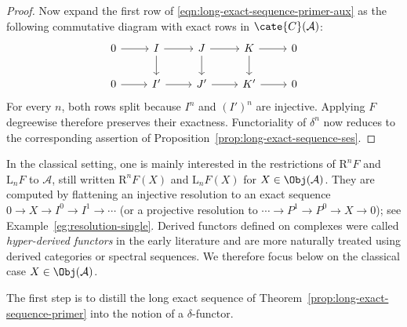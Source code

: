 \begin{proof}
	Now expand the first row of
	\eqref{eqn:long-exact-sequence-primer-aux} as the following commutative
	diagram with exact rows in $\cate{C}(\mathcal{A})$:
	\[\begin{tikzcd}
		0 \arrow[r] & I \arrow[d] \arrow[r] & J \arrow[d] \arrow[r] & K \arrow[d] \arrow[r] & 0 \\
		0 \arrow[r] & I' \arrow[r] & J' \arrow[r] & K' \arrow[r] & 0
	\end{tikzcd}\]
	For every $n$, both rows split because $I^n$ and $(I')^n$ are injective.
	Applying $F$ degreewise therefore preserves their exactness. Functoriality
	of $\delta^n$ now reduces to the corresponding assertion of
	Proposition~\ref{prop:long-exact-sequence-ses}.
\end{proof}

In the classical setting, one is mainly interested in the restrictions of
$\mathrm{R}^nF$ and $\mathrm{L}_nF$ to $\mathcal{A}$, still written
$\mathrm{R}^nF(X)$ and $\mathrm{L}_nF(X)$ for
$X\in\Obj(\mathcal{A})$. They are computed by flattening an injective
resolution to an exact sequence $0\to X\to I^0\to I^1\to\cdots$ (or a
projective resolution to $\cdots\to P^1\to P^0\to X\to0$); see
Example~\ref{eg:resolution-single}. Derived functors defined on complexes were
called \emph{hyper-derived functors} in the early literature and are more
naturally treated using derived categories or spectral sequences. We therefore
focus below on the classical case $X\in\Obj(\mathcal{A})$.

The first step is to distill the long exact sequence of
Theorem~\ref{prop:long-exact-sequence-primer} into the notion of a
$\delta$-functor.

